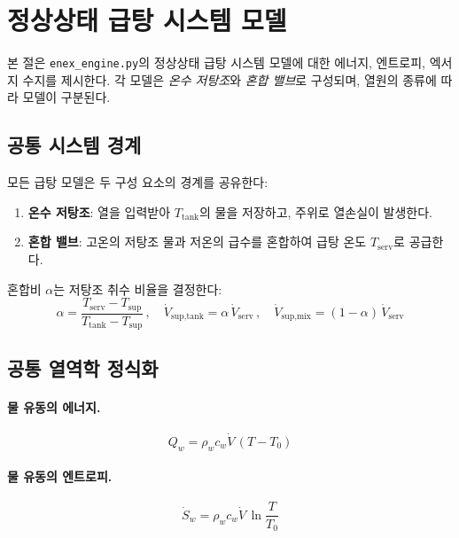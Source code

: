 \section{정상상태 급탕 시스템 모델}
\label{sec:enex-engine}

본 절은 \texttt{enex\_engine.py}의 정상상태 급탕 시스템 모델에 대한 에너지, 엔트로피, 엑서지 수지를 제시한다. 각 모델은 \emph{온수 저탕조}와 \emph{혼합 밸브}로 구성되며, 열원의 종류에 따라 모델이 구분된다.

\subsection{공통 시스템 경계}
\label{sec:dhw-common}

모든 급탕 모델은 두 구성 요소의 경계를 공유한다:
\begin{enumerate}
  \item \textbf{온수 저탕조}: 열을 입력받아 $T_\text{tank}$의 물을 저장하고, 주위로 열손실이 발생한다.
  \item \textbf{혼합 밸브}: 고온의 저탕조 물과 저온의 급수를 혼합하여 급탕 온도 $T_\text{serv}$로 공급한다.
\end{enumerate}

혼합비 $\alpha$는 저탕조 취수 비율을 결정한다:
\begin{equation}\label{eq:dhw-alpha}
  \alpha = \frac{T_\text{serv} - T_\text{sup}}{T_\text{tank} - T_\text{sup}}
  \,,\quad
  \dot{V}_\text{sup,tank} = \alpha\,\dot{V}_\text{serv}
  \,,\quad
  \dot{V}_\text{sup,mix} = (1 - \alpha)\,\dot{V}_\text{serv}
\end{equation}

\subsection{공통 열역학 정식화}

\paragraph{물 유동의 에너지.}
\begin{equation}\label{eq:dhw-Q}
  Q_w = \rho_w c_w \dot{V}\,(T - T_0)
\end{equation}

\paragraph{물 유동의 엔트로피.}
\begin{equation}\label{eq:dhw-S}
  \dot{S}_w = \rho_w c_w \dot{V}\,\ln\frac{T}{T_0}
\end{equation}

